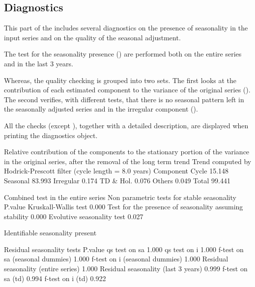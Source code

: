 \documentclass[article]{jss}
\begin{document}
\hypertarget{diagnostics}{%
\subsection{Diagnostics}\label{diagnostics}}

This part of the  includes several diagnostics on the
presence of seasonality in the input series and on the quality of the
seasonal adjustment.

The test for the seasonality presence () are
performed both on the entire series and in the last 3 years.

Whereas, the quality checking is grouped into two sets. The first looks
at the contribution of each estimated component to the variance of the
original series (). The second verifies,
with different tests, that there is no seasonal pattern left in the
seasonally adjusted series and in the irregular component
().

All the checks (except ), together with
a detailed description, are displayed when printing the diagnostics
object.

\begin{CodeChunk}


\begin{CodeOutput}
 Relative contribution of the components to the stationary
 portion of the variance in the original series,
 after the removal of the long term trend 
 Trend computed by Hodrick-Prescott filter (cycle length = 8.0 years)
           Component
 Cycle        15.148
 Seasonal     83.993
 Irregular     0.174
 TD & Hol.     0.076
 Others        0.049
 Total        99.441

 Combined test in the entire series 
 Non parametric tests for stable seasonality
                                                          P.value
   Kruskall-Wallis test                                      0.000
   Test for the presence of seasonality assuming stability   0.000
   Evolutive seasonality test                                0.027
 
 Identifiable seasonality present

 Residual seasonality tests 
                                      P.value
 qs test on sa                          1.000
 qs test on i                           1.000
 f-test on sa (seasonal dummies)        1.000
 f-test on i (seasonal dummies)         1.000
 Residual seasonality (entire series)   1.000
 Residual seasonality (last 3 years)    0.999
 f-test on sa (td)                      0.994
 f-test on i (td)                       0.922
\end{CodeOutput}
\end{CodeChunk}
\end{document}

